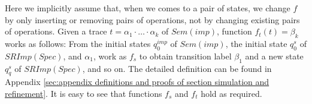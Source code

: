 Here we implicitly assume that, when we comes to a pair of states, we change $f$ by only inserting or removing pairs of operations, not by changing existing pairs of operations. Given a trace $t = \alpha_1 \cdot \ldots \cdot \alpha_k$ of $\mathit{Sem}(\mathit{imp})$, function $f_t(t) = \beta_k$ works as follows: From the initial states $q_0^{\mathit{imp}}$ of $\mathit{Sem}(\mathit{imp})$, the initial state $q_0^{s}$ of $\mathit{SRImp}(\mathit{Spec})$, and $\alpha_1$, work as $f_s$ to obtain transition label $\beta_1$ and a new state $q_q^{s}$ of $\mathit{SRImp}(\mathit{Spec})$, and so on. The detailed definition can be found in Appendix \ref{sec:appendix definitions and proofs of section simulation and refinement}. It is easy to see that functions $f_s$ and $f_t$ hold as required.











